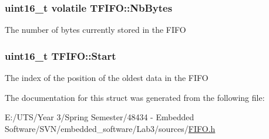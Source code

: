 \subsubsection[{Nb\+Bytes}]{\setlength{\rightskip}{0pt plus 5cm}uint16\+\_\+t volatile T\+F\+I\+F\+O\+::\+Nb\+Bytes}\label{struct_t_f_i_f_o_ace00017651a266a66a93aa5220967611}
The number of bytes currently stored in the F\+I\+F\+O \hypertarget{struct_t_f_i_f_o_a092a7559431a12616672354641908167}{}
\subsubsection[{Start}]{\setlength{\rightskip}{0pt plus 5cm}uint16\+\_\+t T\+F\+I\+F\+O\+::\+Start}\label{struct_t_f_i_f_o_a092a7559431a12616672354641908167}
The index of the position of the oldest data in the F\+I\+F\+O 

The documentation for this struct was generated from the following file\+:\begin{DoxyCompactItemize}
\item 
E\+:/\+U\+T\+S/\+Year 3/\+Spring Semester/48434 -\/ Embedded Software/\+S\+V\+N/embedded\+\_\+software/\+Lab3/sources/\hyperlink{_f_i_f_o_8h}{F\+I\+F\+O.\+h}\end{DoxyCompactItemize}
